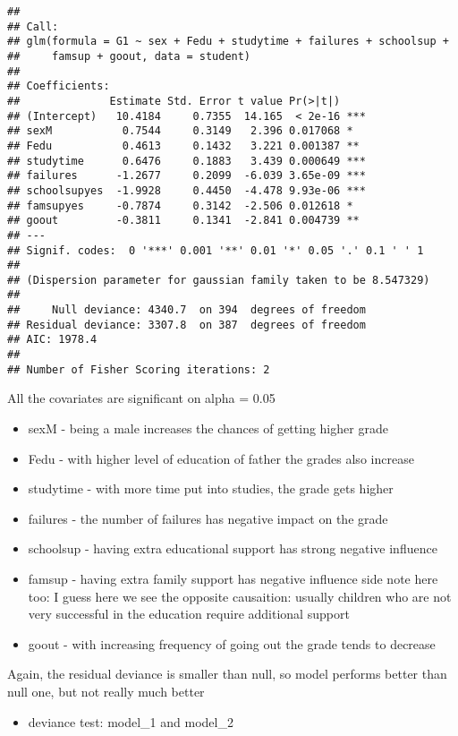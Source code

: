 \documentclass[
]{article}
\providecommand{\tightlist}{%
  \setlength{\itemsep}{0pt}\setlength{\parskip}{0pt}}
\begin{document}
\begin{verbatim}
## 
## Call:
## glm(formula = G1 ~ sex + Fedu + studytime + failures + schoolsup + 
##     famsup + goout, data = student)
## 
## Coefficients:
##              Estimate Std. Error t value Pr(>|t|)    
## (Intercept)   10.4184     0.7355  14.165  < 2e-16 ***
## sexM           0.7544     0.3149   2.396 0.017068 *  
## Fedu           0.4613     0.1432   3.221 0.001387 ** 
## studytime      0.6476     0.1883   3.439 0.000649 ***
## failures      -1.2677     0.2099  -6.039 3.65e-09 ***
## schoolsupyes  -1.9928     0.4450  -4.478 9.93e-06 ***
## famsupyes     -0.7874     0.3142  -2.506 0.012618 *  
## goout         -0.3811     0.1341  -2.841 0.004739 ** 
## ---
## Signif. codes:  0 '***' 0.001 '**' 0.01 '*' 0.05 '.' 0.1 ' ' 1
## 
## (Dispersion parameter for gaussian family taken to be 8.547329)
## 
##     Null deviance: 4340.7  on 394  degrees of freedom
## Residual deviance: 3307.8  on 387  degrees of freedom
## AIC: 1978.4
## 
## Number of Fisher Scoring iterations: 2
\end{verbatim}

All the covariates are significant on alpha = 0.05

\begin{itemize}
\tightlist
\item
  sexM - being a male increases the chances of getting higher grade
\item
  Fedu - with higher level of education of father the grades also
  increase
\item
  studytime - with more time put into studies, the grade gets higher
\item
  failures - the number of failures has negative impact on the grade
\item
  schoolsup - having extra educational support has strong negative
  influence
\item
  famsup - having extra family support has negative influence side note
  here too: I guess here we see the opposite causaition: usually
  children who are not very successful in the education require
  additional support
\item
  goout - with increasing frequency of going out the grade tends to
  decrease
\end{itemize}

Again, the residual deviance is smaller than null, so model performs
better than null one, but not really much better

\begin{itemize}
\tightlist
\item
  deviance test: model\_1 and model\_2
\end{itemize}
\end{document}
